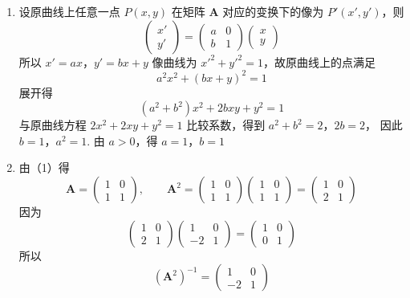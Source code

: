 \begin{solution}
\begin{enumerate}
\item 设原曲线上任意一点 \(P(x,y)\) 在矩阵 \(\mathbf{A}\) 对应的变换下的像为 \(P'(x',y')\)，则
\[
\begin{pmatrix}x'\\y'\end{pmatrix}
=\begin{pmatrix}a&0\\b&1\end{pmatrix}
\begin{pmatrix}x\\y\end{pmatrix}
\]
所以
\(x'=ax\)，\(y'=bx+y\)
像曲线为 \(x'^{2}+y'^{2}=1\)，故原曲线上的点满足
\[
a^{2}x^{2}+(bx+y)^{2}=1
\]
展开得
\[
(a^{2}+b^{2})x^{2}+2bxy+y^{2}=1
\]
与原曲线方程 \(2x^{2}+2xy+y^{2}=1\) 比较系数，得到
\(a^{2}+b^{2}=2\)，\(2b=2\)，
因此 \(b=1\)，\(a^{2}=1\). 由 \(a>0\)，得
\(a=1\)，\(b=1\)

\item 由（1）得
\[
\mathbf{A}=\begin{pmatrix}1&0\\1&1\end{pmatrix},\qquad
\mathbf{A}^{2}
=\begin{pmatrix}1&0\\1&1\end{pmatrix}
\begin{pmatrix}1&0\\1&1\end{pmatrix}
=\begin{pmatrix}1&0\\2&1\end{pmatrix}
\]
因为
\[
\begin{pmatrix}1&0\\2&1\end{pmatrix}
\begin{pmatrix}1&0\\-2&1\end{pmatrix}
=\begin{pmatrix}1&0\\0&1\end{pmatrix}
\]
所以
\[
(\mathbf{A}^{2})^{-1}=\begin{pmatrix}1&0\\-2&1\end{pmatrix}
\]
\end{enumerate}
\end{solution}

